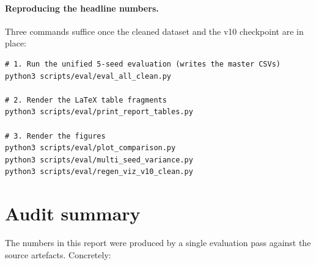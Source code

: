 \documentclass[oneside, a4paper, onecolumn, 11pt]{article}
\begin{document}
\paragraph{Reproducing the headline numbers.}
Three commands suffice once the cleaned dataset and the v10
checkpoint are in place:

\begin{verbatim}
# 1. Run the unified 5-seed evaluation (writes the master CSVs)
python3 scripts/eval/eval_all_clean.py

# 2. Render the LaTeX table fragments
python3 scripts/eval/print_report_tables.py

# 3. Render the figures
python3 scripts/eval/plot_comparison.py
python3 scripts/eval/multi_seed_variance.py
python3 scripts/eval/regen_viz_v10_clean.py
\end{verbatim}

\section{Audit summary}\label{app:audit}

The numbers in this report were produced by a single evaluation
pass against the source artefacts.  Concretely:
\end{document}
